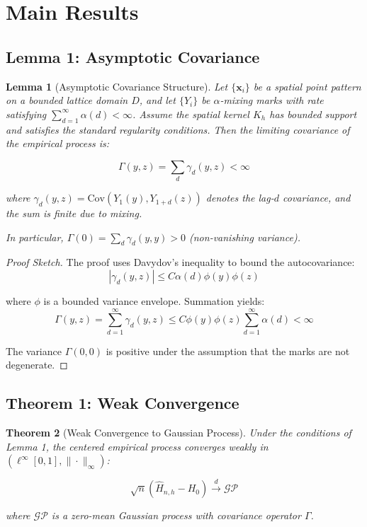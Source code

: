 \documentclass[12pt]{article}
\theoremstyle{plain}
\newtheorem{theorem}{Theorem}
\newtheorem{lemma}[theorem]{Lemma}
\theoremstyle{definition}
\newcommand{\dto}{\xrightarrow{d}}
\newcommand{\abs}[1]{\left\lvert #1 \right\rvert}
\newcommand{\Cov}[1]{\mathrm{Cov}(#1)}
\newcommand{\1}[1]{\mathbf{1}_{#1}}
\begin{document}
\section{Main Results}

\subsection{Lemma 1: Asymptotic Covariance}

\begin{lemma}[Asymptotic Covariance Structure]
Let $\{\mathbf{x}_i\}$ be a spatial point pattern on a bounded lattice domain $D$, and let $\{Y_i\}$ be $\alpha$-mixing marks with rate satisfying $\sum_{d=1}^\infty \alpha(d) < \infty$. Assume the spatial kernel $K_h$ has bounded support and satisfies the standard regularity conditions. Then the limiting covariance of the empirical process is:

\begin{equation}
\Gamma(y,z) = \sum_{d} \gamma_d(y,z) < \infty
\end{equation}

where $\gamma_d(y,z) = \Cov{Y_1(y), Y_{1+d}(z)}$ denotes the lag-$d$ covariance, and the sum is finite due to mixing.

In particular, $\Gamma(0) = \sum_d \gamma_d(y,y) > 0$ (non-vanishing variance).
\end{lemma}

\begin{proof}[Proof Sketch]
The proof uses Davydov's inequality \citep{Rio93} to bound the autocovariance:
\begin{equation}
\abs{\gamma_d(y,z)} \le C \alpha(d) \phi(y) \phi(z)
\end{equation}

where $\phi$ is a bounded variance envelope. Summation yields:
\begin{equation}
\Gamma(y,z) = \sum_{d=1}^\infty \gamma_d(y,z) \le C \phi(y) \phi(z) \sum_{d=1}^\infty \alpha(d) < \infty
\end{equation}

The variance $\Gamma(0,0)$ is positive under the assumption that the marks are not degenerate.
\end{proof}

\subsection{Theorem 1: Weak Convergence}

\begin{theorem}[Weak Convergence to Gaussian Process]
Under the conditions of Lemma 1, the centered empirical process converges weakly in $(\ell^\infty[0,1], \|\cdot\|_\infty)$:

\begin{equation}
\sqrt{n} \left(\widehat{H}_{n,h} - H_0\right) \dto \mathcal{GP}
\end{equation}

where $\mathcal{GP}$ is a zero-mean Gaussian process with covariance operator $\Gamma$.
\end{theorem}
\end{document}
